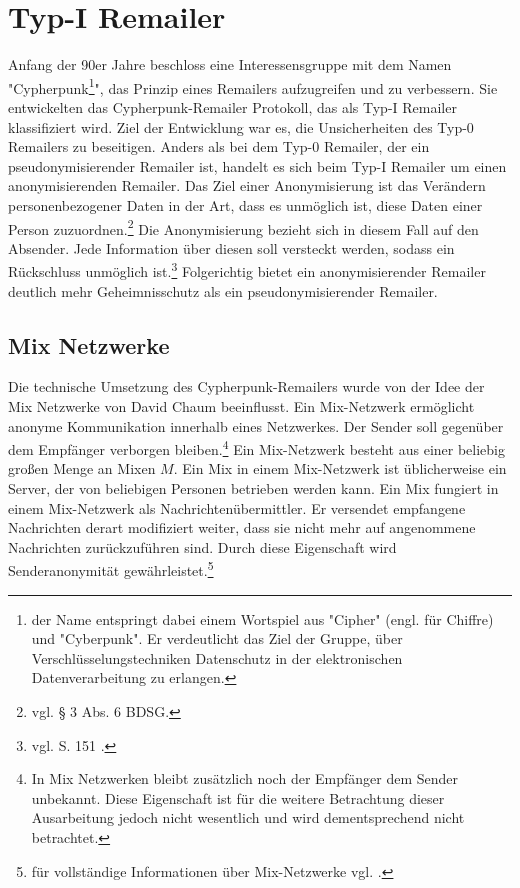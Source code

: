 \chapter{Typ-I Remailer}
Anfang der 90er Jahre beschloss eine Interessensgruppe mit dem Namen "Cypherpunk\footnote{der Name entspringt dabei einem Wortspiel aus "Cipher" (engl. für Chiffre) und "Cyberpunk". Er verdeutlicht das Ziel der Gruppe, über Verschlüsselungstechniken Datenschutz in der elektronischen Datenverarbeitung zu erlangen.}", das Prinzip eines Remailers aufzugreifen und zu verbessern. Sie entwickelten das Cypherpunk-Remailer Protokoll, das als Typ-I Remailer klassifiziert wird. Ziel der Entwicklung war es, die Unsicherheiten des Typ-0 Remailers zu beseitigen.
Anders als bei dem Typ-0 Remailer, der ein pseudonymisierender Remailer ist, handelt es sich beim Typ-I Remailer um einen anonymisierenden Remailer. Das Ziel einer Anonymisierung ist das Verändern personenbezogener Daten in der Art, dass es unmöglich ist, diese Daten einer Person zuzuordnen.\footnote {vgl. § 3 Abs. 6 BDSG.}
Die Anonymisierung bezieht sich in diesem Fall auf den Absender. Jede Information über diesen soll versteckt werden, sodass ein Rückschluss unmöglich ist.\footnote{vgl. S. 151 \cite{horster2013datenschutz}.} Folgerichtig bietet ein anonymisierender Remailer deutlich mehr Geheimnisschutz als ein pseudonymisierender Remailer. 


\section{Mix Netzwerke}
Die technische Umsetzung des Cypherpunk-Remailers wurde von der Idee der Mix Netzwerke von David Chaum beeinflusst. Ein Mix-Netzwerk ermöglicht anonyme Kommunikation innerhalb eines Netzwerkes. Der Sender soll gegenüber dem Empfänger verborgen bleiben.\footnote{In Mix Netzwerken bleibt zusätzlich noch der Empfänger dem Sender unbekannt. Diese Eigenschaft ist für die weitere Betrachtung dieser Ausarbeitung jedoch nicht wesentlich und wird dementsprechend nicht betrachtet.}
Ein Mix-Netzwerk besteht aus einer beliebig großen Menge an Mixen \(M\). Ein Mix in einem Mix-Netzwerk ist üblicherweise ein Server, der von beliebigen Personen betrieben werden kann. Ein Mix fungiert in einem Mix-Netzwerk als Nachrichtenübermittler. Er versendet empfangene Nachrichten derart modifiziert weiter, dass sie nicht mehr auf angenommene Nachrichten zurückzuführen sind. Durch diese Eigenschaft wird Senderanonymität gewährleistet.\footnote{für vollständige Informationen über Mix-Netzwerke vgl.  \cite{chaum1981}.}

